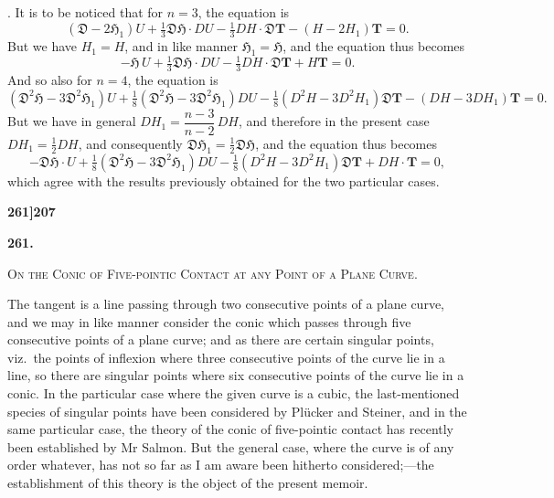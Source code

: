 \documentclass[11pt]{article}
\begin{document}
. It is to be noticed that for $n = 3$, the equation is
\[
(\mathfrak{D} - 2\mathfrak{H}_1)U + \tfrac{1}{3}\mathfrak{D}\mathfrak{H} \cdot DU - \tfrac{1}{3}DH \cdot \mathfrak{D}\mathbf{T} - (H - 2H_1)\mathbf{T} = 0.
\]
But we have $H_1 = H$, and in like manner $\mathfrak{H}_1 = \mathfrak{H}$, and the equation thus becomes
\[
-\mathfrak{H}\,U + \tfrac{1}{3}\mathfrak{D}\mathfrak{H} \cdot DU - \tfrac{1}{3}DH \cdot \mathfrak{D}\mathbf{T} + H\mathbf{T} = 0.
\]
And so also for $n = 4$, the equation is
\[
(\mathfrak{D}^2\mathfrak{H} - 3\mathfrak{D}^2\mathfrak{H}_1)U + \tfrac{1}{8}(\mathfrak{D}^2\mathfrak{H} - 3\mathfrak{D}^2\mathfrak{H}_1)DU
   - \tfrac{1}{8}(D^2H - 3D^2H_1)\mathfrak{D}\mathbf{T} - (DH - 3DH_1)\mathbf{T} = 0.
\]
But we have in general $DH_1 = \dfrac{n-3}{n-2}\,DH$, and therefore in the present case $DH_1 = \tfrac{1}{2}DH$, and consequently $\mathfrak{D}\mathfrak{H}_1 = \tfrac{1}{2}\mathfrak{D}\mathfrak{H}$, and the equation thus becomes
\[
-\mathfrak{D}\mathfrak{H} \cdot U + \tfrac{1}{8}(\mathfrak{D}^2\mathfrak{H} - 3\mathfrak{D}^2\mathfrak{H}_1)DU - \tfrac{1}{8}(D^2H - 3D^2H_1)\mathfrak{D}\mathbf{T} + DH \cdot \mathbf{T} = 0,
\]
which agree with the results previously obtained for the two particular cases.

\newpage


\noindent\textbf{261]}\hfill\textbf{207}

\bigskip

\begin{center}
{\large\bfseries 261.}

\medskip

{\scshape On the Conic of Five-pointic Contact at any Point of a Plane Curve.}
\end{center}

\medskip


\bigskip

\noindent The tangent is a line passing through two consecutive points of a plane curve, and we may in like manner consider the conic which passes through five consecutive points of a plane curve; and as there are certain singular points, viz.\ the points of inflexion where three consecutive points of the curve lie in a line, so there are singular points where six consecutive points of the curve lie in a conic. In the particular case where the given curve is a cubic, the last-mentioned species of singular points have been considered by Pl\"ucker and Steiner, and in the same particular case, the theory of the conic of five-pointic contact has recently been established by Mr Salmon. But the general case, where the curve is of any order whatever, has not so far as I am aware been hitherto considered;---the establishment of this theory is the object of the present memoir.
\end{document}
